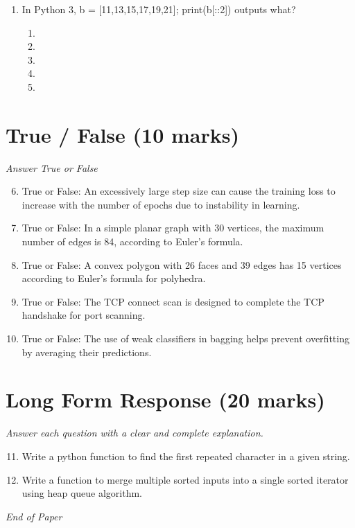 \documentclass[12pt]{article}
\begin{document}
\begin{enumerate}[label=\arabic*.]
$$\begin{enumerate}[label=(\alph*)]
    \item 3
    \item 0
    \item 8
    \item 4
\end{enumerate}
\item In Python 3, b = [11,13,15,17,19,21]; print(b[::2]) outputs what?
\begin{enumerate}[label=(\alph*)]
    \item [13,17,21]
    \item [13,15,17]
    \item [11,15]
    \item [11,13,15,19]
    \item [11,15,19]
\end{enumerate}
\end{enumerate}

\section*{True / False (10 marks)}
\textit{Answer True or False}
\begin{enumerate}[label=\arabic*.]
\setcounter{enumi}{5}
\item True or False: An excessively large step size can cause the training loss to increase with the number of epochs due to instability in learning.
\item True or False: In a simple planar graph with 30 vertices, the maximum number of edges is 84, according to Euler's formula.
\item True or False: A convex polygon with 26 faces and 39 edges has 15 vertices according to Euler's formula for polyhedra.
\item True or False: The TCP connect scan is designed to complete the TCP handshake for port scanning.
\item True or False: The use of weak classifiers in bagging helps prevent overfitting by averaging their predictions.
\end{enumerate}

\section*{Long Form Response (20 marks)}
\textit{Answer each question with a clear and complete explanation.}
\begin{enumerate}[label=\arabic*.]
\setcounter{enumi}{10}
\item Write a python function to find the first repeated character in a given string.
\item Write a function to merge multiple sorted inputs into a single sorted iterator using heap
queue algorithm.
\end{enumerate}

\vfill
\noindent\textit{End of Paper}
\end{document}
